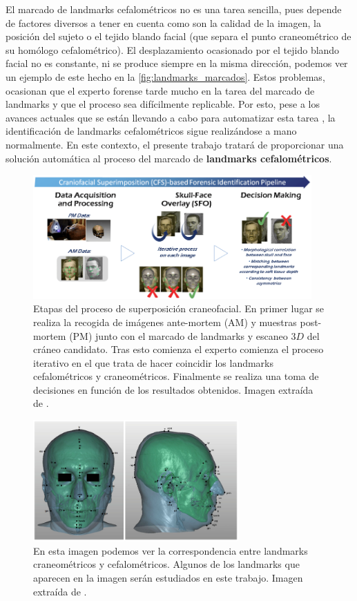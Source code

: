     \noindent El marcado de landmarks cefalométricos no es una tarea sencilla, pues depende de factores diversos a tener en cuenta como son la calidad de la imagen, la posición del sujeto o el tejido blando facial (que separa el punto craneométrico de su homólogo cefalométrico). El desplazamiento ocasionado por el tejido blando facial no es constante, ni se produce siempre en la misma dirección, podemos ver un ejemplo de este hecho en la \autoref{fig:landmarks_marcados}. Estos problemas, ocasionan que el experto forense tarde mucho en la tarea del marcado de landmarks y que el proceso sea difícilmente replicable. Por esto, pese a los avances actuales que se están llevando a cabo para automatizar esta tarea \cite{Huete2015PastPA}, la identificación de landmarks cefalométricos sigue realizándose a mano normalmente. En este contexto, el presente trabajo tratará de proporcionar una solución automática al proceso del marcado de \textbf{landmarks cefalométricos}.
    \begin{figure}[H]
        \centering
        \includegraphics[width=0.95\textwidth]{img/SCF.png}
        \caption{Etapas del proceso de superposición craneofacial. En primer lugar se realiza la recogida de imágenes ante-mortem (AM) y muestras post-mortem (PM) junto con el marcado de landmarks y escaneo $3D$ del cráneo candidato. Tras esto comienza el experto comienza el proceso iterativo en el que trata de hacer coincidir los landmarks cefalométricos y craneométricos. Finalmente se realiza una toma de decisiones en función de los resultados obtenidos. Imagen extraída de \cite{article}.}
        \label{fig:procesoSCF}
    \end{figure}
    \begin{figure}[H]
        \centering
        \includegraphics[width=0.7\textwidth]{img/marcado_landmarks.png}
        \caption{En esta imagen podemos ver la correspondencia entre landmarks craneométricos y cefalométricos. Algunos de los landmarks que aparecen en la imagen serán estudiados en este trabajo. Imagen extraída de \cite{damas2020handbook}.}
        \label{fig:landmarks_marcados}
    \end{figure}

